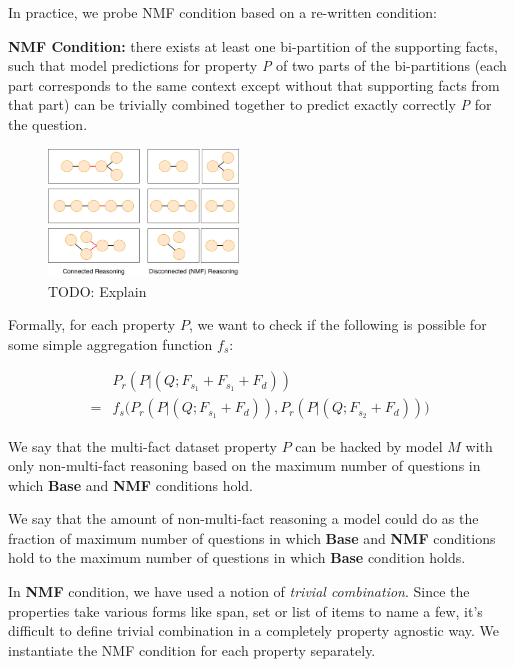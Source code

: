 In practice, we probe NMF condition based on a re-written condition:

\noindent \textbf{NMF Condition:} there exists at least one bi-partition of the supporting facts, such that model predictions for property {\it P} of two parts of the bi-partitions (each part corresponds to the same context except without that supporting facts from that part) can be trivially combined together to predict exactly correctly {\it P} for the question.

\begin{figure}[t]
    \centering
	\includegraphics[width=0.45\textwidth]{images/factored-graph-v2}
	\caption{TODO: Explain }
	\label{fig:intro}
\end{figure}

Formally, for each property $P$, we want to check if the following is possible for some simple aggregation function $f_s$:

\begin{align}
     & P_r(P | (Q; F_{s_1} + F_{s_1} + F_d)) \nonumber  \\
    =& f_{s}\big(P_r(P | (Q; F_{s_1} + F_d)), P_r(P | (Q; F_{s_2} + F_d)) \big) \nonumber 
\end{align}


We say that the multi-fact dataset property $P$ can be hacked by model $M$ with only non-multi-fact reasoning based on the maximum number of questions in which \textbf{Base} and \textbf{NMF} conditions hold.

We say that the amount of non-multi-fact reasoning a model could do as the fraction of maximum number of questions in which \textbf{Base} and \textbf{NMF} conditions hold to the maximum number of questions in which \textbf{Base} condition holds.

In \textbf{NMF} condition, we have used a notion of \textit{trivial combination}. Since the properties take various forms like span, set or list of items to name a few, it's difficult to define trivial combination in a completely property agnostic way. We instantiate the NMF condition for each property separately.


